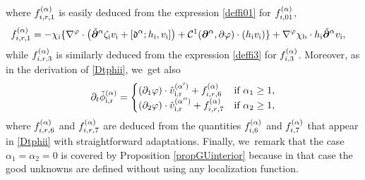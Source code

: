 \documentclass[11pt]{article}
\newcommand{\dt}{\partial_t}
\theoremstyle{definition}
\begin{document}
where $f_{{\rm i},{\rm r},1}^{(\alpha)}$ is easily deduced from the expression \eqref{deffi01} for $f_{{\rm i},01}^{(\alpha)}$,
\begin{align*}
f_{{\rm i},{\rm r},1}^{(\alpha)}
&= -\chi_\mathrm{i}\{ \nabla^\varphi\cdot\bigl(\check{\bm{\partial}}^\alpha\zeta_\mathrm{i} v_\mathrm{i}
+ [\mathfrak{d}^\alpha;h_\mathrm{i},v_\mathrm{i}] \bigr)
+ {\mathcal C}^1(\bm{\partial}^\alpha,\partial\varphi)\cdot(h_\mathrm{i}v_\mathrm{i}) \}
+ \nabla^\varphi\chi_\mathrm{b}\cdot h_\mathrm{i} \check{\bm{\partial}}^\alpha v_\mathrm{i} ,
\end{align*}
while $f_{{\rm i},{\rm r},3}^{(\alpha)}$ is similarly deduced from the expression \eqref{deffi3} for $f_{{\rm i},3}^{(\alpha)}$.
Moreover, as in the derivation of \eqref{Dtphii}, we~get also
\begin{equation}\label{Dtphiir}
\dt\check{\phi}_\mathrm{i,r}^{(\alpha)} =
\begin{cases}
(\partial_1\varphi)\cdot\check{v}_\mathrm{i,r}^{(\alpha')} + f_{{\rm i,r},6}^{(\alpha)} &\mbox{if } \alpha_1\geq1, \\
(\partial_2\varphi)\cdot\check{v}_\mathrm{i,r}^{(\alpha'')} + f_{{\rm i,r},7}^{(\alpha)} &\mbox{if } \alpha_2\geq1,
\end{cases}
\end{equation}
where $f_{{\rm i,r},6}^{(\alpha)}$ and $f_{{\rm i,r},7}^{(\alpha)}$ are deduced from the quantities $f_{{\rm i},6}^{(\alpha)}$ and
$f_{{\rm i},7}^{(\alpha)}$ that appear in \eqref{Dtphii} with straightforward adaptations.
Finally, we~remark that the case $\alpha_1=\alpha_2=0$ is covered by Proposition \ref{propGUinterior}
because in that case the good unknowns are defined without using any localization function.
\end{document}
